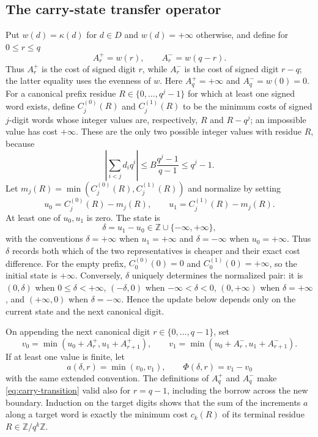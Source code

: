 \documentclass[11pt]{article}
\begin{document}
\subsection{The carry-state transfer operator}\label{sec:carry-state-operator}
Put $w(d)=\kappa(d)$ for $d\in D$ and $w(d)=+\infty$ otherwise, and define
for $0\le r\le q$
\[
 A_r^+=w(r),\qquad A_r^-=w(q-r).
\]
Thus $A_r^+$ is the cost of signed digit $r$, while $A_r^-$ is the cost of
signed digit $r-q$; the latter equality uses the evenness of $w$.
Here $A_q^+=+\infty$ and $A_q^-=w(0)=0$.  For a canonical prefix residue
$R\in\{0,\ldots,q^j-1\}$ for which at least one signed word exists, define
$C_j^{(0)}(R)$ and
$C_j^{(1)}(R)$ to be the minimum costs of signed $j$-digit words whose
integer values are, respectively, $R$ and $R-q^j$; an impossible value has
cost $+\infty$.  These are the only two possible integer values with residue
$R$, because
\[
 \left|\sum_{i<j}d_iq^i\right|
 \le B\frac{q^j-1}{q-1}\le q^j-1.
\]
Let $m_j(R)=\min(C_j^{(0)}(R),C_j^{(1)}(R))$ and normalize by setting
\[
 u_0=C_j^{(0)}(R)-m_j(R),\qquad
 u_1=C_j^{(1)}(R)-m_j(R).
\]
At least one of $u_0,u_1$ is zero.  The state is
\[
 \delta=u_1-u_0\in\mathbb Z\cup\{-\infty,+\infty\},
\]
with the conventions $\delta=+\infty$ when $u_1=+\infty$ and
$\delta=-\infty$ when $u_0=+\infty$.  Thus $\delta$ records both which of
the two representatives is cheaper and their exact cost difference.  For
the empty prefix, $C_0^{(0)}(0)=0$ and $C_0^{(1)}(0)=+\infty$, so the initial
state is $+\infty$.
Conversely, $\delta$ uniquely determines the normalized pair: it is
$(0,\delta)$ when $0\le\delta<+\infty$, $(-\delta,0)$ when
$-\infty<\delta<0$, $(0,+\infty)$ when $\delta=+\infty$, and
$(+\infty,0)$ when $\delta=-\infty$.  Hence the update below depends only
on the current state and the next canonical digit.

On appending the next canonical digit $r\in\{0,\ldots,q-1\}$, set
\begin{equation}\label{eq:carry-transition}
 v_0=\min(u_0+A_r^+,u_1+A_{r+1}^+),\qquad
 v_1=\min(u_0+A_r^-,u_1+A_{r+1}^-).
\end{equation}
If at least one value is finite, let
\[
 a(\delta,r)=\min(v_0,v_1),\qquad
 \Phi(\delta,r)=v_1-v_0
\]
with the same extended convention.  The definitions of $A_q^+$ and $A_q^-$
make \eqref{eq:carry-transition} valid also for $r=q-1$, including the
borrow across the new boundary.  Induction on the target digits shows that
the sum of the increments $a$ along a target word is exactly the minimum
cost $c_k(R)$ of its terminal residue $R\in\mathbb Z/q^k\mathbb Z$.
\end{document}
